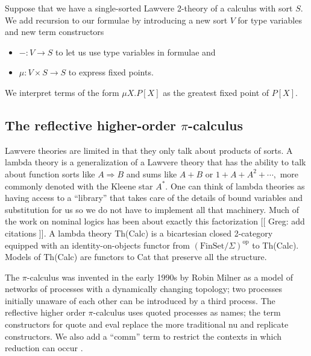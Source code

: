 \documentclass{llncs}
\newcommand{\maps}{\colon}
\newcommand{\FinSet}{\mathrm{FinSet}}
\newcommand{\op}{\mathrm{op}}
\begin{document}
Suppose that we have a single-sorted Lawvere 2-theory of a calculus with sort $S$.  We add recursion to our formulae by introducing a new sort $V$ for type variables and new term constructors 
\begin{itemize}
  \item $- \maps V \to S$ to let us use type variables in formulae and
  \item $\mu\maps V\times S \to S$ to express fixed points.
\end{itemize}

We interpret terms of the form $\mu X.P[X]$ as the greatest fixed point of $P[X].$

\subsection{The reflective higher-order $\pi$-calculus}

Lawvere theories are limited in that they only talk about products of sorts.  A lambda theory is a generalization of a Lawvere theory that has the ability to talk about function sorts like $A \Rightarrow B$ and sums like $A+B$ or $1 + A + A^2 + \cdots,$ more commonly denoted with the Kleene star $A^*.$  One can think of lambda theories as having access to a ``library'' that takes care of the details of bound variables and substitution for us so we do not have to implement all that machinery.  Much of the work on nominal logics has been about exactly this factorization [[ Greg: add citations ]].  A lambda theory Th(Calc) is a bicartesian closed 2-category equipped with an identity-on-objects functor from $(\FinSet/\Sigma)^{\op}$ to Th(Calc).  Models of Th(Calc) are functors to Cat that preserve all the structure.

The $\pi$-calculus was invented in the early 1990s by Robin Milner as a model of networks of processes with a dynamically changing topology; two processes initially unaware of each other can be introduced by a third process.  The reflective higher order $\pi$-calculus uses quoted processes as names; the term constructors for quote and eval replace the more traditional nu and replicate constructors.  We also add a ``comm'' term to restrict the contexts in which reduction can occur \cite{DBLP:journals/corr/StayM15}.
\end{document}
